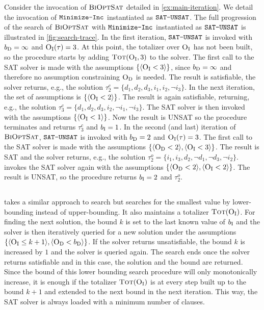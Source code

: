 \begin{example}\label{ex:satunsat}
  Consider the invocation of $\textsc{BiOptSat}$ detailed in \cref{ex:main-iteration}. 
  We detail the invocation of $\texttt{Minimize-\allowbreak{}Inc}$ instantiated as $\texttt{SAT-\allowbreak{}UNSAT}$. 
  The full progression of the search of $\textsc{BiOptSat}$ with $\texttt{Minimize-\allowbreak{}Inc}$ instantiated as $\texttt{SAT-\allowbreak{}UNSAT}$ is illustrated in \cref{fig:search-trace}.
  In the first iteration, $\texttt{SAT-\allowbreak{}UNSAT}$ is invoked with $b_{\text{D}} =\infty$ and $\textsc{O}_{\text{I}}(\tau) = 3$.
  At this point, the totalizer over $\textsc{O}_{\text{I}}$ has not been built, so the procedure starts by adding $\textsc{Tot}(\textsc{O}_{\text{I}}, 3)$ to the solver.
  The first call to the SAT solver is made with the assumptions $\{\langle \textsc{O}_{\text{I}} < 3 \rangle\}$, since $b_{\text{D}}  = \infty$ and therefore no assumption constraining $\textsc{O}_{\text{D}}$ is needed.
  The result is satisfiable, the solver returns, e.g., the solution $\tau^c_2 = \{d_1, d_2, d_3, i_1, i_2, \lnot i_3\}$. 
  In the next iteration, the set of assumptions is $\{\langle \textsc{O}_{\text{I}} < 2 \rangle\}$.
  The result is again satisfiable, returning, e.g., the solution $\tau^c_3 = \{ d_1,  d_2, d_3, i_2, \lnot i_1, \lnot i_3\}$.
  The SAT solver is then invoked with the assumptions  $\{\langle \textsc{O}_{\text{I}} < 1 \rangle\}$.
  Now the result is UNSAT so the procedure terminates and returns $\tau^c_3$ and $b_{\text{I}} = 1$. 
  In the second (and last) iteration of $\textsc{BiOptSat}$, $\texttt{SAT-\allowbreak{}UNSAT}$ is invoked with $b_{\text{D}} = 2$ and $\textsc{O}_{\text{I}}(\tau) = 3$.
  The first call to the SAT solver is made with the assumptions $\{ \langle \textsc{O}_{\text{D}} < 2 \rangle, \langle \textsc{O}_{\text{I}} < 3 \rangle\}$.
  The result is SAT and the solver returns, e.g., the solution $\tau^o_2 = \{ i_1, i_3, d_2, \lnot d_1, \lnot d_3, \lnot i_2 \}$.
  \satunsat{} invokes the SAT solver again with the assumptions $\{ \langle \textsc{O}_{\text{D}} < 2 \rangle, \langle \textsc{O}_{\text{I}} < 2 \rangle \}$.
  The result is UNSAT, so the procedure returns $b_{\text{I}} = 2$ and $\tau^o_2$.
\end{example}

\subsection{\unsatsat{}\label{sec:unsat-sat}}

\unsatsat{} takes a similar approach to \satunsat{} search but searches for the smallest value by lower-bounding instead of upper-bounding.
It also maintains a totalizer $\textsc{Tot}(\textsc{O}_{\text{I}})$.
For finding the next solution, the bound $k$ is set to the last known value of $b_{\text{I}}$ and the solver is then iteratively queried for a new solution under the assumptions $\{ \langle \textsc{O}_{\text{I}} \leq k+1 \rangle, \langle \textsc{O}_{\text{D}} < b_{\text{D}} \rangle \}$.
If the solver returns unsatisfiable, the bound $k$ is increased by $1$ and the solver is queried again.
The search ends once the solver returns satisfiable and in this case, the solution and the bound are returned.
Since the bound of this lower bounding search procedure will only monotonically increase, it is enough if the totalizer $\textsc{Tot}(\textsc{O}_{\text{I}})$ is at every step built up to the bound $k+1$ and extended to the next bound in the next iteration.
This way, the SAT solver is always loaded with a minimum number of clauses.

